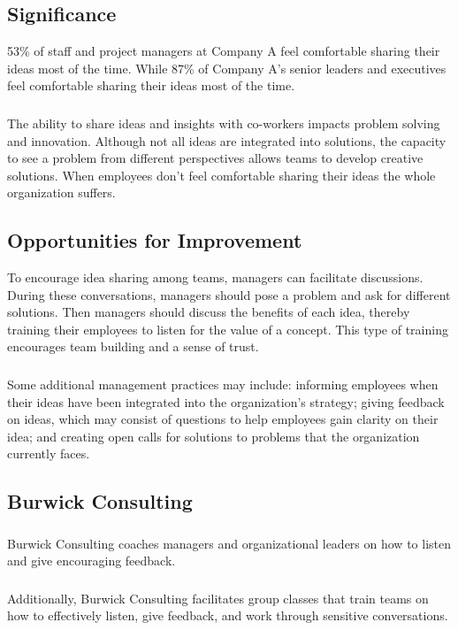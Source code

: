 \documentclass[14pt]{extreport}
\begin{document}
\subsection*{\centering Significance}
53\% of staff and project managers at Company A feel comfortable sharing their ideas most of the time. While 87\%
of Company A’s senior leaders and executives feel comfortable sharing their ideas most of the time.
\subsubsection*{}
The ability to share ideas and insights with co-workers impacts problem
solving and innovation. Although not all ideas are integrated into
solutions, the capacity to see a problem from different perspectives
allows teams to develop creative solutions. When employees don’t feel
comfortable sharing their ideas the whole organization suffers.
\subsection*{\centering Opportunities for Improvement}
To encourage idea sharing among teams, managers can facilitate
discussions. During these conversations, managers should pose a problem and ask for different solutions. Then managers should discuss the benefits of each idea, thereby training their employees to listen for the value of a concept. This type of training encourages team building and a sense of trust.

\subsubsection*{}
Some additional management practices may include: informing employees when their ideas have been integrated into the organization’s strategy; giving feedback on ideas, which may consist of questions to help employees gain clarity on their idea; and creating open calls for solutions to problems that the organization currently faces.

\subsection*{\centering Burwick Consulting}
\subsubsection*{}
Burwick Consulting coaches managers and organizational leaders on how to listen and give encouraging feedback. 
\subsubsection*{}
Additionally, Burwick Consulting facilitates group classes that train teams on how to effectively listen, give feedback, and work through sensitive conversations. 
\end{document}
